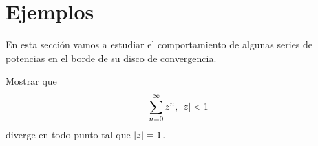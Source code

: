 \chapter{Ejemplos}


En esta sección vamos a estudiar el comportamiento de algunas series de potencias en el borde de su disco de convergencia.


\begin{example}
    Mostrar que
    \begin{equation*}
        \sum_{n=0}^{\infty} z^n, \, \left\lvert z\right\rvert < 1
    \end{equation*}
    diverge en todo punto tal que $\left\lvert z\right\rvert = 1$.
\end{example}

